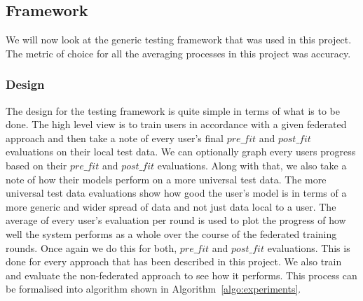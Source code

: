 \documentclass[12pt]{article}
\begin{document}
\subsection{Framework}\label{subsec:framework}
We will now look at the generic testing framework that was used in this project. The metric of choice for all the averaging processes in this project was accuracy. 
\subsubsection{Design}
The design for the testing framework is quite simple in terms of what is to be done. The high level view is to train users in accordance with a given federated approach and then take a note of every user's final $pre\_fit$ and $post\_fit$ evaluations on their local test data. We can optionally graph every users progress based on their $pre\_fit$ and $post\_fit$ evaluations. Along with that, we also take a note of how their models perform on a more universal test data. The more universal test data evaluations show how good the user's model is in terms of a more generic and wider spread of data and not just data local to a user. The average of every user's evaluation per round is used to plot the progress of how well the system performs as a whole over the course of the federated training rounds. Once again we do this for both, $pre\_fit$ and $post\_fit$ evaluations. This is done for every approach that has been described in this project. We also train and evaluate the non-federated approach to see how it performs. This process can be formalised into algorithm shown in Algorithm~\ref{algo:experiments}.
\end{document}
